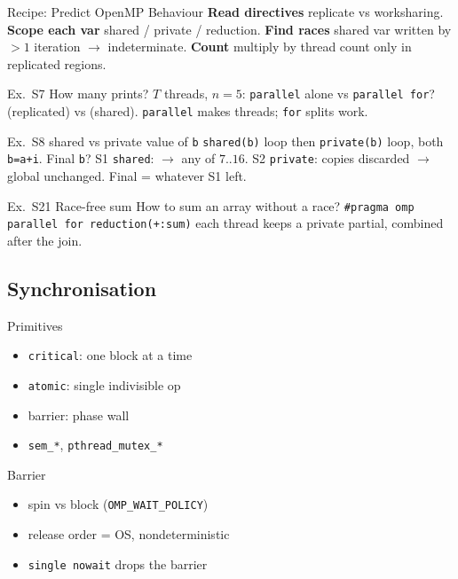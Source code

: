\begin{KR}{Recipe: Predict OpenMP Behaviour}
    \textbf{Read directives} replicate vs worksharing.
    \textbf{Scope each var} shared / private / reduction.
    \textbf{Find races} shared var written by $>1$ iteration $\to$ indeterminate.
    \textbf{Count} multiply by thread count only in replicated regions.
\end{KR}

\begin{example2}{Ex.\ S7 How many prints?}
    $T$ threads, $n=5$: \texttt{parallel} alone vs \texttt{parallel for}?
    \tcblower
     (replicated) vs  (shared). \texttt{parallel} makes threads; \texttt{for} splits work.
\end{example2}

\begin{example2}{Ex.\ S8 shared vs private value of \texttt{b}}
    \texttt{shared(b)} loop then \texttt{private(b)} loop, both \texttt{b=a+i}. Final \texttt{b}?
    \tcblower
    S1 \texttt{shared}:  $\to$ any of $7..16$. S2 \texttt{private}: copies discarded $\to$ global unchanged. Final = whatever S1 left.
\end{example2}

\begin{example2}{Ex.\ S21 Race-free sum}
    How to sum an array without a race?
    \tcblower
    \texttt{\#pragma omp parallel for reduction(+:sum)} each thread keeps a private partial, combined after the join.
\end{example2}

\subsection{Synchronisation}


\begin{definition}{Primitives}
    \begin{itemize}
        \item \texttt{critical}: one block at a time
        \item \texttt{atomic}: single indivisible op
        \item barrier: phase wall
        \item \texttt{sem\_*}, \texttt{pthread\_mutex\_*}
    \end{itemize}
\end{definition}

\begin{concept}{Barrier}
    \begin{itemize}
        \item spin vs block (\texttt{OMP\_WAIT\_POLICY})
        \item release order = OS, nondeterministic
        \item \texttt{single nowait} drops the barrier
    \end{itemize}
\end{concept}

